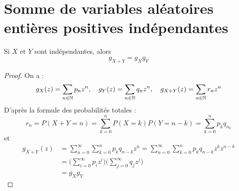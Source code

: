 \section*{Somme de variables aléatoires entières positives indépendantes}

\begin{theorem}
    Si $X$ et $Y$ sont indépendantes, alors 
        \[ g_{X + Y} = g_X g_Y \] 
\end{theorem}

\begin{proof}
    On a :
        \[ g_X(z) = \sum_{n\in \mathbb{N}} p_n z^n, \quad g_Y(z) = \sum_{n \in \mathbb{N}} q_n z^n, \quad g_{X+Y}(z) = \sum_{n \in \mathbb{N}} r_n z^n \] 
    D'après la formule des probabilités totales :
        \[ r_n = P(X + Y = n) = \sum_{k = 0}^{n} P(X = k) P(Y = n-k) = \sum_{k=0}^{n} p_k q_{n_k} \]
    et 
    \begin{align*}
        g_{X +Y}(z) &= \sum_{n = 0}^{\infty} \sum_{k = 0}^{n} p_k q_{n-k} z^n = \sum_{n = 0}^{\infty} \sum_{k = 0}^{n} p_k q_{n-k} z^k z^{n-k} \\
        &= \Biggl( \sum_{i = 0}^{\infty} p_i z^i \Biggr) \Biggl( \sum_{j = 0}^{\infty} q_j z^j \Biggr) \\
        &= g_X g_Y
    \end{align*}
   
\end{proof}
